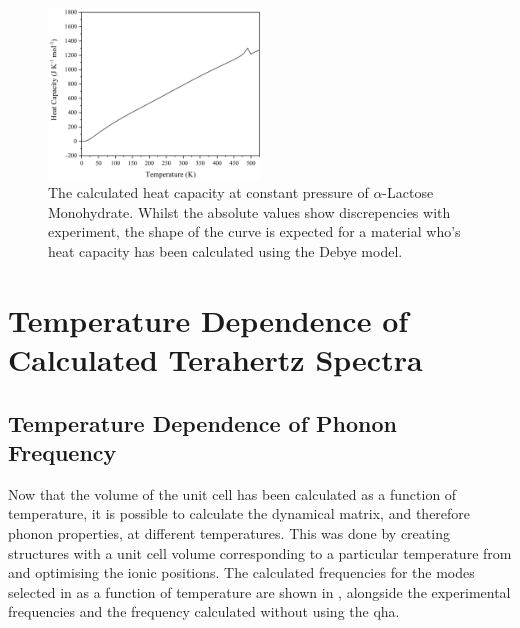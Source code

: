 \begin{figure}
\centering
\includegraphics[width=0.5\textwidth]{Figures/Misc/QHA/CpG.png}
\captionsetup{font = footnotesize, justification = centering}
\caption[The Calculated Heat Capacity at Constant Pressure of \(\alpha\)-Lactose Monohydrate]{The calculated heat capacity at constant pressure of \(\alpha\)-Lactose Monohydrate. Whilst the absolute values show discrepencies with experiment, the shape of the curve is expected for a material who's heat capacity has been calculated using the Debye model.}
\label{fig:Cp}
\end{figure}

\section{Temperature Dependence of Calculated Terahertz Spectra}
\subsection{Temperature Dependence of Phonon Frequency}
Now that the volume of the unit cell has been calculated as a function of temperature, it is possible to calculate the dynamical matrix, and therefore phonon properties, at different temperatures. This was done by creating structures with a unit cell volume corresponding to a particular temperature from  and optimising the ionic positions. The calculated frequencies for the modes selected in  as a function of temperature are shown in , alongside the experimental frequencies and the frequency calculated without using the \acrshort{qha}.


